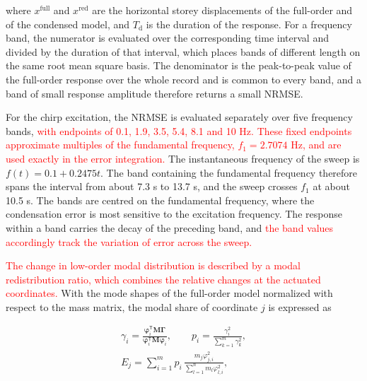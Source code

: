 \documentclass[a4paper,fleqn,review,12pt]{cas-sc}
\numberwithin{equation}{section}
\newcommand{\rev}[1]{\textcolor{red}{#1}}
\begin{document}
\noindent where \(x^{\mathrm{full}}\) and \(x^{\mathrm{red}}\) are the horizontal storey displacements of the full-order and of the condensed model, and \(T_{\mathrm{d}}\) is the duration of the response. For a frequency band, the numerator is evaluated over the corresponding time interval and divided by the duration of that interval, which places bands of different length on the same root mean square basis. The denominator is the peak-to-peak value of the full-order response over the whole record and is common to every band, and a band of small response amplitude therefore returns a small NRMSE.

For the chirp excitation, the NRMSE is evaluated separately over five frequency bands, \rev{with endpoints of 0.1, 1.9, 3.5, 5.4, 8.1 and 10 Hz. These fixed endpoints approximate multiples of the fundamental frequency, \(f_1=2.7074\) Hz, and are used exactly in the error integration.} The instantaneous frequency of the sweep is \(f(t)=0.1+0.2475t\). The band containing the fundamental frequency therefore spans the interval from about 7.3 s to 13.7 s, and the sweep crosses \(f_{1}\) at about 10.5 s. The bands are centred on the fundamental frequency, where the condensation error is most sensitive to the excitation frequency. The response within a band carries the decay of the preceding band, and \rev{the band values accordingly track the variation of error across the sweep.}

\rev{The change in low-order modal distribution is described by a modal redistribution ratio, which combines the relative changes at the actuated coordinates.} With the mode shapes of the full-order model normalized with respect to the mass matrix, the modal share of coordinate \(j\) is expressed as

\vspace{-3.5em}
\begin{equation}
	\begin{gathered}
		\gamma_{i}=
		\frac{\bm{\varphi}_{i}^{\mathsf{T}}\mathbf{M}\bm{\Gamma}}
		{\bm{\varphi}_{i}^{\mathsf{T}}\mathbf{M}\bm{\varphi}_{i}},
		\qquad
		p_{i}=\frac{\gamma_{i}^{2}}{\displaystyle\sum_{k=1}^{m}\gamma_{k}^{2}},\\[2pt]
		E_{j}=\sum_{i=1}^{m}p_{i}\,
		\frac{m_{j}\varphi_{j,i}^{2}}{\displaystyle\sum_{l=1}^{n}m_{l}\varphi_{l,i}^{2}},
	\end{gathered}
	\label{eq:dof-energy}
\end{equation}
\vspace{-3.0em}
\end{document}
